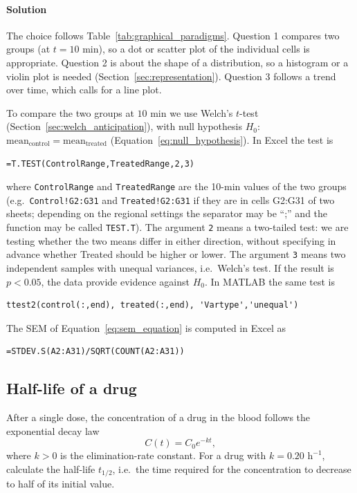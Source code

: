 \paragraph{Solution} The choice follows Table~\ref{tab:graphical_paradigms}. Question 1 compares two groups (at $t = 10\text{ min}$), so a dot or scatter plot of the individual cells is appropriate. Question 2 is about the shape of a distribution, so a histogram or a violin plot is needed (Section~\ref{sec:representation}). Question 3 follows a trend over time, which calls for a line plot.

To compare the two groups at $10\text{ min}$ we use Welch's $t$-test (Section~\ref{sec:welch_anticipation}), with null hypothesis $H_0$: $\text{mean}_{\text{control}} = \text{mean}_{\text{treated}}$ (Equation~\eqref{eq:null_hypothesis}). In Excel the test is
\begin{verbatim}
=T.TEST(ControlRange,TreatedRange,2,3)
\end{verbatim}
where \texttt{ControlRange} and \texttt{TreatedRange} are the 10-min values of the two groups (e.g.\ \texttt{Control!G2:G31} and \texttt{Treated!G2:G31} if they are in cells G2:G31 of two sheets; depending on the regional settings the separator may be ``;'' and the function may be called \texttt{TEST.T}). The argument \texttt{2} means a two-tailed test: we are testing whether the two means differ in either direction, without specifying in advance whether Treated should be higher or lower. The argument \texttt{3} means two independent samples with unequal variances, i.e.\ Welch's test. If the result is $p < 0.05$, the data provide evidence against $H_0$. In MATLAB the same test is
\begin{verbatim}
ttest2(control(:,end), treated(:,end), 'Vartype','unequal')
\end{verbatim}
The SEM of Equation~\eqref{eq:sem_equation} is computed in Excel as
\begin{verbatim}
=STDEV.S(A2:A31)/SQRT(COUNT(A2:A31))
\end{verbatim}

\subsection{Half-life of a drug}
\label{ex:half_life}

After a single dose, the concentration of a drug in the blood follows the exponential decay law
\begin{equation*}
C(t) = C_0 e^{-kt},
\end{equation*}
where $k > 0$ is the elimination-rate constant. For a drug with $k = 0.20\text{ h}^{-1}$, calculate the half-life $t_{1/2}$, i.e.\ the time required for the concentration to decrease to half of its initial value.

